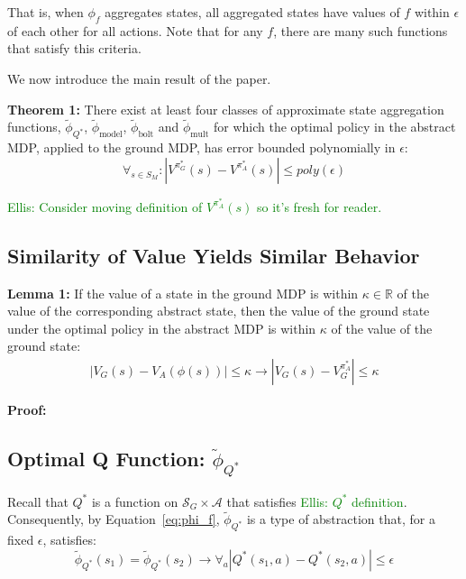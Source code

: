 \documentclass{article}
\newcommand{\ep}{\widetilde \phi}
\newcommand\enote[1]{\textcolor{green}{Ellis: #1}}
\begin{document}
That is, when $\phi_f$ aggregates states, all aggregated states have values of $f$ within $\epsilon$ of each other for all actions. Note that for any $f$, there are many such functions that satisfy this criteria.

We now introduce the main result of the paper.

{\bf Theorem 1:} There exist at least four classes of approximate state aggregation functions, $\ep_{Q^*}$, $\ep_{\text{model}}$, $\ep_{\text{bolt}}$ and $\ep_{\text{mult}}$ for which the optimal policy in the abstract MDP, applied to the ground MDP, has error bounded polynomially in $\epsilon$:
\begin{equation}
\forall_{s \in S_M} : | V^{\pi^*_G}(s) - V^{\pi^*_{A}}(s) | \leq poly(\epsilon)
\end{equation}

\enote{Consider moving definition of $V^{\pi^*_{A}}(s)$ so it's fresh for reader.}

\subsection{Similarity of Value Yields Similar Behavior}

{\bf Lemma 1:}
If the value of a state in the ground \ac{MDP} is within $\kappa \in \mathbb{R}$ of the value of the corresponding abstract state, then the value of the ground state under the optimal policy in the abstract \ac{MDP} is within $\kappa$ of the value of the ground state:
\begin{multline*}
| V_G(s) - V_A(\phi (s)) | \leq \kappa \rightarrow
\left| V_G(s) - V_G^{\pi_A^*} \right| \leq \kappa
\end{multline*}

\textbf{Proof:}


\subsection{Optimal Q Function: $\ep_{Q^*}$}

Recall that $Q^*$ is a function on $\mathcal{S}_G \times \mathcal{A}$ that satisfies \enote{$Q^*$ definition}. Consequently, by Equation~\ref{eq:phi_f}, $\ep_{Q^*}$ is a type of abstraction that, for a fixed $\epsilon$, satisfies:
\begin{equation}
\ep_{Q^*}(s_1) = \ep_{Q^*}(s_2) \rightarrow \forall_a \left|Q^*(s_1, a) - Q^*(s_2, a)\right| \leq \epsilon
\end{equation}
\end{document}
